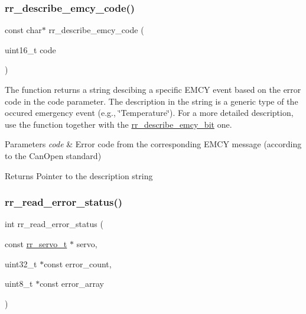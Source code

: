 \subsubsection{\texorpdfstring{rr\+\_\+describe\+\_\+emcy\+\_\+code()}{rr\_describe\_emcy\_code()}}
{\footnotesize\ttfamily const char$\ast$ rr\+\_\+describe\+\_\+emcy\+\_\+code (\begin{DoxyParamCaption}\item[{uint16\+\_\+t}]{code }\end{DoxyParamCaption})}



The function returns a string descibing a specific E\+M\+CY event based on the error code in the \textquotesingle{}code\textquotesingle{} parameter. The description in the string is a generic type of the occured emergency event (e.\+g., \char`\"{}\+Temperature\char`\"{}). For a more detailed description, use the function together with the \hyperlink{group___err_gaa949cec80a64afa06ed9816fe1132888}{rr\+\_\+describe\+\_\+emcy\+\_\+bit} one. 


\begin{DoxyParams}{Parameters}
{\em code} & Error code from the corresponding E\+M\+CY message (according to the Can\+Open standard) \\
\hline
\end{DoxyParams}
\begin{DoxyReturn}{Returns}
Pointer to the description string 
\end{DoxyReturn}
\mbox{\label{group___err_ga0803e0fab3e22b1bcb3f51aa393328b4}} 
\subsubsection{\texorpdfstring{rr\+\_\+read\+\_\+error\+\_\+status()}{rr\_read\_error\_status()}}
{\footnotesize\ttfamily int rr\+\_\+read\+\_\+error\+\_\+status (\begin{DoxyParamCaption}\item[{const \hyperlink{structrr__servo__t}{rr\+\_\+servo\+\_\+t} $\ast$}]{servo,  }\item[{uint32\+\_\+t $\ast$const}]{error\+\_\+count,  }\item[{uint8\+\_\+t $\ast$const}]{error\+\_\+array }\end{DoxyParamCaption})}



